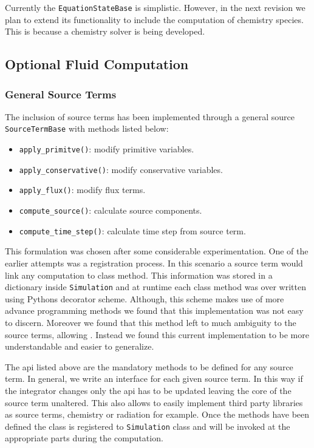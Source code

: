 Currently the \lstinline{EquationStateBase} is simplistic. However, in the next revision we plan
to extend its functionality to include the computation of chemistry species. This is because a chemistry 
solver is being developed.

\subsection{Optional Fluid Computation}
\subsubsection{General Source Terms}
The inclusion of source terms has been implemented through a general source
\lstinline{SourceTermBase} with methods listed below:
\begin{itemize}
    \item \lstinline{apply_primitve()}: modify primitive variables.
    \item \lstinline{apply_conservative()}: modify conservative variables.
    \item \lstinline{apply_flux()}: modify flux terms.
    \item \lstinline{compute_source()}: calculate source components.
    \item \lstinline{compute_time_step()}: calculate time step from source term.
\end{itemize}
This formulation was chosen after some considerable experimentation. One of the
earlier attempts was a registration process. In this scenario a source term
would link any computation to class method. This information was stored
in a dictionary inside \lstinline{Simulation} and at runtime each class method
was over written using Pythons decorator scheme. Although, this scheme makes
use of more advance programming methods we found that this implementation was
not easy to discern. Moreover we found that this method left to much ambiguity
to the source terms, allowing . Instead we
found this current implementation to be more understandable and easier to
generalize.

The api listed above are the mandatory methods to be defined for any source
term. In general, we write an interface for each given source term. In this
way if the integrator changes only the api has to be updated leaving
the core of the source term unaltered. This also allows to easily implement
third party libraries as source terms, chemistry or radiation for example.
Once the methods have been defined the class is registered to 
\lstinline{Simulation} class and will be invoked at the appropriate parts
during the computation.

